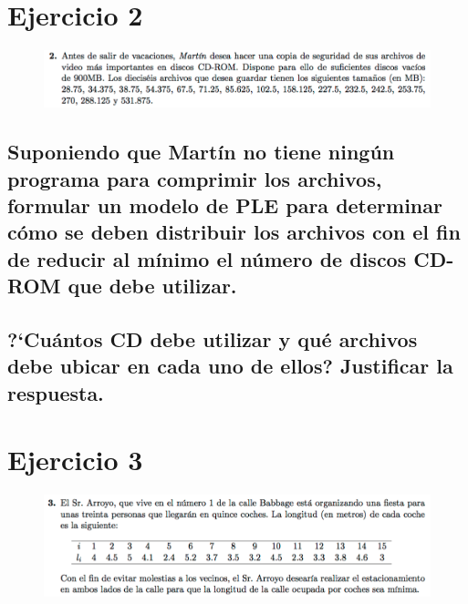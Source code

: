 \documentclass[10pt, a4paper]{article}
\begin{document}
	\section{Ejercicio 2}

        \begin{figure}[H]
        \centering
            \includegraphics[width=\textwidth]{res/exercise-2.png}
        \end{figure}


		\subsection{Suponiendo que Martín no tiene ningún programa para comprimir los archivos, formular un modelo de PLE para determinar cómo se deben distribuir los archivos con el fin de reducir al mínimo el número de discos CD-ROM que debe utilizar.}

			\paragraph{}

		\subsection{?`Cuántos CD debe utilizar y qué archivos debe ubicar en cada uno de ellos? Justificar la respuesta.}

			\paragraph{}


	\section{Ejercicio 3}

        \begin{figure}[H]
        \centering
            \includegraphics[width=\textwidth]{res/exercise-3.png}
        \end{figure}
\end{document}
